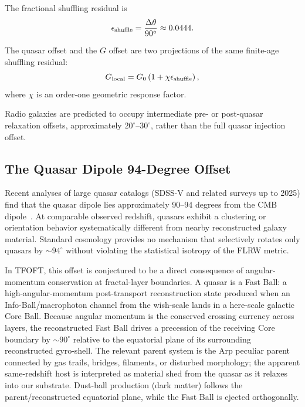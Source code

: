 \documentclass[11pt,a4paper]{article}
\begin{document}
The fractional shuffling residual is
\begin{equation}
\epsilon_{\rm shuffle}
=
\frac{\Delta\theta}{90^\circ}
\approx
0.0444.
\end{equation}

The quasar offset and the \(G\) offset are two projections of the same finite-age shuffling residual:
\begin{equation}
G_{\rm local}
=
G_0
\left(
1+
\chi\epsilon_{\rm shuffle}
\right),
\end{equation}
where \(\chi\) is an order-one geometric response factor.

Radio galaxies are predicted to occupy intermediate pre- or post-quasar relaxation offsets, approximately \(20^\circ\)--\(30^\circ\), rather than the full quasar injection offset.


\subsection{The Quasar Dipole 94-Degree Offset}

Recent analyses of large quasar catalogs (SDSS-V and related surveys up to 2025) find that the quasar dipole lies approximately 90--94 degrees from the CMB dipole~\cite{Secrest2022,Secrest2025}. At comparable observed redshift, quasars exhibit a clustering or orientation behavior systematically different from nearby reconstructed galaxy material. Standard cosmology provides no mechanism that selectively rotates only quasars by $\sim94^\circ$ without violating the statistical isotropy of the FLRW metric.

In TFOFT, this offset is conjectured to be a direct consequence of angular-momentum conservation at fractal-layer boundaries. A quasar is a Fast Ball: a high-angular-momentum post-transport reconstruction state produced when an Info-Ball/macrophoton channel from the wish-scale lands in a here-scale galactic Core Ball. Because angular momentum is the conserved crossing currency across layers, the reconstructed Fast Ball drives a precession of the receiving Core boundary by $\sim90^\circ$ relative to the equatorial plane of its surrounding reconstructed gyro-shell. The relevant parent system is the Arp peculiar parent connected by gas trails, bridges, filaments, or disturbed morphology; the apparent same-redshift host is interpreted as material shed from the quasar as it relaxes into our substrate. Dust-ball production (dark matter) follows the parent/reconstructed equatorial plane, while the Fast Ball is ejected orthogonally.
\end{document}
